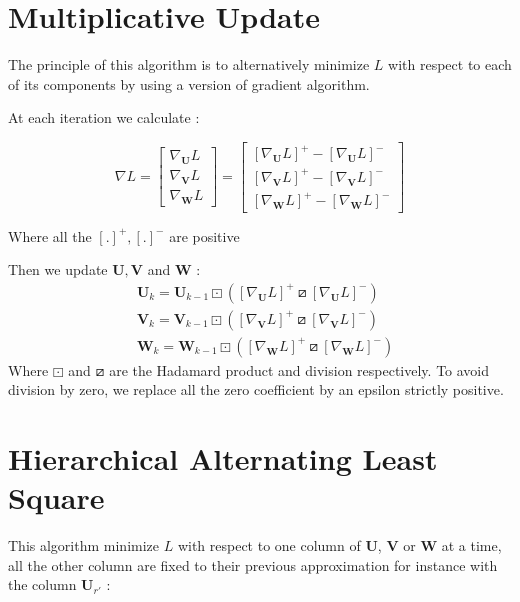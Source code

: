 \documentclass{article}
\begin{document}
\section{Multiplicative Update}
The principle of this algorithm is to alternatively minimize $L$ with respect to each of its components by
using a version of gradient algorithm.

At each iteration we calculate :

\[\nabla L = \begin{bmatrix}
                \nabla_{\mathbf{U}} L\\
                \nabla_{\mathbf{V}} L \\
                \nabla_{\mathbf{W}} L 
            \end{bmatrix} = \begin{bmatrix}
                                [\nabla_{\mathbf{U}} L]^{+}-[\nabla_{\mathbf{U}} L]^{-}\\
                                [\nabla_{\mathbf{V}} L]^{+}-[\nabla_{\mathbf{V}} L]^{-} \\
                                [\nabla_{\mathbf{W}} L]^{+}-[\nabla_{\mathbf{W}} L]^{-} 
                            \end{bmatrix}
\]

Where all the $[.]^{+}, [.]^{-}$ are positive

Then we update $\mathbf{U}, \mathbf{V}$ and $\mathbf{W}$ :
\begin{align*}
    &\mathbf{U}_{k} = \mathbf{U}_{k-1}\boxdot ([\nabla_{\mathbf{U}} L]^{+}\boxslash[\nabla_{\mathbf{U}} L]^{-}) \\
    &\mathbf{V}_{k} = \mathbf{V}_{k-1}\boxdot ([\nabla_{\mathbf{V}} L]^{+}\boxslash[\nabla_{\mathbf{V}} L]^{-}) \\
    &\mathbf{W}_{k} = \mathbf{W}_{k-1}\boxdot ([\nabla_{\mathbf{W}} L]^{+}\boxslash[\nabla_{\mathbf{W}} L]^{-})
\end{align*}
Where $\boxdot$ and $\boxslash$ are the Hadamard product and division respectively. To avoid division by zero, we replace all the zero coefficient by an epsilon strictly positive.




\section{Hierarchical Alternating Least Square}
This algorithm minimize $L$ with respect to one column of $\mathbf{U}$, $\mathbf{V}$ or $\mathbf{W}$ at a time, all the other column are fixed to their previous approximation
for instance with the column $\mathbf{U}_{r'}$ :
\end{document}
